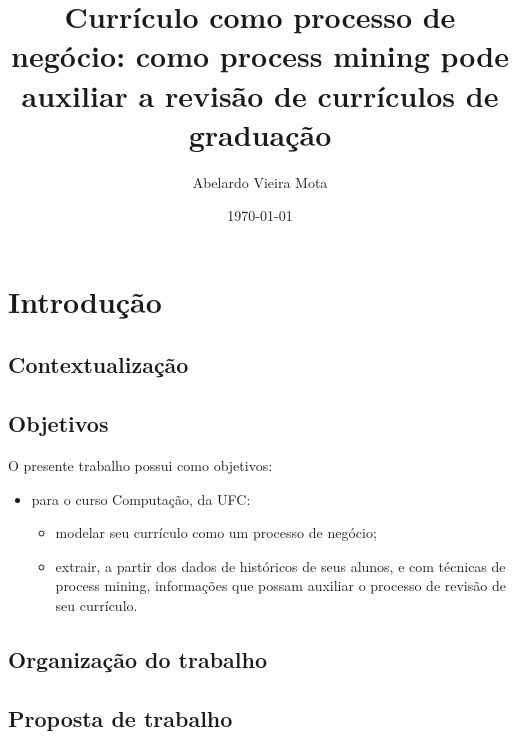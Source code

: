 \documentclass[a4paper]{article}
\title{Currículo como processo de negócio: como process mining pode auxiliar a revisão de currículos de graduação}
\author{Abelardo Vieira Mota}
\date{\today}
\begin{document}
\maketitle

\begin{abstract}
\lipsum[1]
\lipsum[2]
\end{abstract}

\tableofcontents

\section{Introdução}

\subsection{Contextualização}
\lipsum[3]
\lipsum[4]
\lipsum[5]
\lipsum[6]
\lipsum[7]

\subsection{Objetivos}

O presente trabalho possui como objetivos:

\begin{itemize}
\item para o curso Computação, da UFC:

\begin{itemize}
\item modelar seu currículo como um processo de negócio;
\item extrair, a partir dos dados de históricos de seus alunos, e com técnicas de process mining, informações que possam auxiliar o processo de revisão de seu currículo.
\end{itemize}

\end{itemize}
\lipsum[12]
\lipsum[13]

\subsection{Organização do trabalho}

\lipsum[15]

\subsection{Proposta de trabalho}
\end{document}

